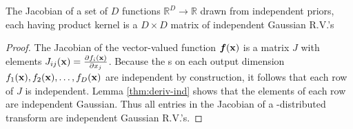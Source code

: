 \documentclass{article} %
\begin{document}
\begin{lemma}
\label{thm:matrix}
The Jacobian of a set of $D$ functions $\mathbb{R}^D \rightarrow \mathbb{R}$ drawn from independent \gp{} priors, each having product kernel is a $D \times D$ matrix of independent Gaussian R.V.'s
\end{lemma}
%
\begin{proof}
The Jacobian of the vector-valued function $\boldsymbol{f}({\bf{x}})$ is a matrix $J$ with elements ${J_{ij}({\bf{x}}) = \frac{ \partial f_i ({\bf{x}}) }{\partial x_j}}$.
%
%
%
Because the \gp{}s on each output dimension $f_1({\bf{x}}), f_2({\bf{x}}), \dots, f_D({\bf{x}})$ are independent by construction, it follows that each row of $J$ is independent.
Lemma \ref{thm:deriv-ind} shows that the elements of each row are independent Gaussian.
Thus all entries in the Jacobian of a \gp{}-distributed transform are independent Gaussian R.V.'s.
\end{proof}
\end{document}
